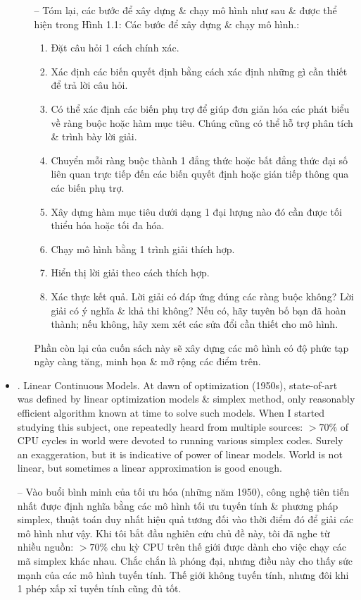 \documentclass{article}
\begin{document}
\begin{itemize}
\begin{itemize}
        -- Tóm lại, các bước để xây dựng \& chạy mô hình như sau \& được thể hiện trong {\sf Hình 1.1: Các bước để xây dựng \& chạy mô hình.}:
        \begin{enumerate}
            \item Đặt câu hỏi 1 cách chính xác.
            \item Xác định các biến quyết định bằng cách xác định những gì cần thiết để trả lời câu hỏi.
            \item Có thể xác định các biến phụ trợ để giúp đơn giản hóa các phát biểu về ràng buộc hoặc hàm mục tiêu. Chúng cũng có thể hỗ trợ phân tích \& trình bày lời giải.
            \item Chuyển mỗi ràng buộc thành 1 đẳng thức hoặc bất đẳng thức đại số liên quan trực tiếp đến các biến quyết định hoặc gián tiếp thông qua các biến phụ trợ.
            \item Xây dựng hàm mục tiêu dưới dạng 1 đại lượng nào đó cần được tối thiểu hóa hoặc tối đa hóa.
            \item Chạy mô hình bằng 1 trình giải thích hợp.
            \item Hiển thị lời giải theo cách thích hợp.
            \item Xác thực kết quả. Lời giải có đáp ứng đúng các ràng buộc không? Lời giải có ý nghĩa \& khả thi không? Nếu có, hãy tuyên bố bạn đã hoàn thành; nếu không, hãy xem xét các sửa đổi cần thiết cho mô hình.
        \end{enumerate}
        Phần còn lại của cuốn sách này sẽ xây dựng các mô hình có độ phức tạp ngày càng tăng, minh họa \& mở rộng các điểm trên.
    \end{itemize}
    \item {. Linear Continuous Models.} At dawn of optimization (1950s), state-of-art was defined by linear optimization models \& simplex method, only reasonably efficient algorithm known at time to solve such models. When I started studying this subject, one repeatedly heard from multiple sources: $> 70\%$ of CPU cycles in world were devoted to running various simplex codes. Surely an exaggeration, but it is indicative of power of linear models. World is not linear, but sometimes a linear approximation is good enough.

    -- Vào buổi bình minh của tối ưu hóa (những năm 1950), công nghệ tiên tiến nhất được định nghĩa bằng các mô hình tối ưu tuyến tính \& phương pháp simplex, thuật toán duy nhất hiệu quả tương đối vào thời điểm đó để giải các mô hình như vậy. Khi tôi bắt đầu nghiên cứu chủ đề này, tôi đã nghe từ nhiều nguồn: $> 70\%$ chu kỳ CPU trên thế giới được dành cho việc chạy các mã simplex khác nhau. Chắc chắn là phóng đại, nhưng điều này cho thấy sức mạnh của các mô hình tuyến tính. Thế giới không tuyến tính, nhưng đôi khi 1 phép xấp xỉ tuyến tính cũng đủ tốt.


\end{itemize}
\end{document}
